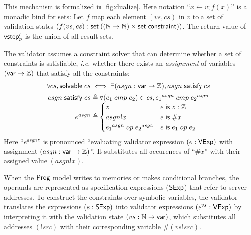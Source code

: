 This mechanism is formalized in \autoref{fig:dualize}.  Here notation ``$x\gets
v;f(x)$'' is a monadic bind for sets: Let $f$ map each element $(vs,cs)$ in $v$
to a set of validation states
$(f(vs,cs):\mathsf{set}\;((\mathbb N\to\mathbb N)\times\mathsf{set}\;\mathsf{constraint}))$.  The return value of
$\mathsf{vstep}_p'$ is the union of all result sets.

The validator assumes a constraint solver that can determine whether a set of
constraints is satisfiable, {\it i.e.} whether there exists an {\em assignment}
of variables $(\mathsf{var}\to\mathbb Z)$ that satisfy all the constraints:
\begin{gather*}
  \forall cs,\solvable cs\iff\exists (asgn:\Var\to\Int),\satisfy{asgn}cs\\
  \begin{array}{r@{\;}l}
    \satisfy{asgn}cs\triangleq&\forall(e_1\;cmp\;e_2)\in cs, {e_1}^{asgn}\;cmp\;{e_2}^{asgn}\\
    e^{asgn}\triangleq&\begin{cases}
      z&e\Is z:\Int\\
      asgn!x&e\Is \#x\\
      {e_1}^{asgn}\;op\;{e_2}^{asgn}&e\Is e_1\;op\;e_2
    \end{cases}
  \end{array}
\end{gather*}
Here ``$e^{asgn}$'' is pronounced ``evaluating validator expression $(e:\mathsf{VExp})$
with assignment $(asgn:\mathsf{var}\to\mathbb Z)$''.  It substitutes all occurences of
``$\#x$'' with their assigned value $(asgn!x)$.

When the $\mathsf{Prog}$ model writes to memories or makes conditional branches, the
operands are represented as specification expressions ($\mathsf{SExp}$) that refer to
server addresses.  To construct the constraints over symbolic variables, the
validator translates the expressions $(e:\mathsf{SExp})$ into validator expressions
$(e^{vs}:\mathsf{VExp})$ by interpreting it with the validation state
$(vs:\mathbb N\to\mathsf{var})$, which substitutes all addresses $(!src)$ with their
corresponding variable $\#(vs!src)$.

